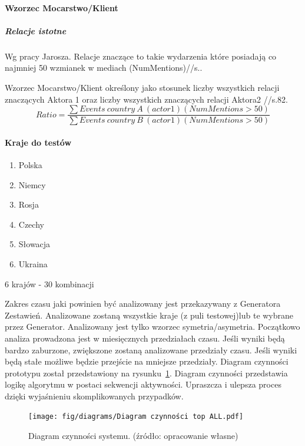 \documentclass[11pt]{report}
\begin{document}
    \paragraph{Wzorzec Mocarstwo/Klient}

    \subparagraph{Relacje istotne}
    Wg pracy Jarosza.
    Relacje znaczące to takie wydarzenia które posiadają co najmniej 50 wzmianek w mediach (NumMentions)//s..

    Wzorzec Mocarstwo/Klient określony jako stosunek liczby wszystkich relacji znaczących Aktora 1 oraz liczby wszystkich znaczących relacji Aktora2 //s.\@ 82.
    \[ Ratio = \frac
    {\sum{Events\ country\ A\ (actor 1) (NumMentions > 50)}}
    {\sum{Events\ country\ B\ (actor 1) (NumMentions > 50)}}
    \]

    \paragraph{Kraje do testów}
    \begin{enumerate}
        \item Polska
        \item Niemcy
        \item Rosja
        \item Czechy
        \item Słowacja
        \item Ukraina
    \end{enumerate}
    6 krajów - 30 kombinacji

    Zakres czasu jaki powinien być analizowany jest przekazywany z Generatora Zestawień.
    Analizowane zostaną wszystkie kraje (z puli testowej)lub te wybrane przez Generator.
    Analizowany jest tylko wzorzec symetria/asymetria.
    Początkowo analiza prowadzona jest w miesięcznych przedziałach czasu.
    Jeśli wyniki będą bardzo zaburzone, zwiększone zostaną analizowane przedziały czasu.
    Jeśli wyniki będą stałe możliwe będzie przejście na mniejsze przedziały.
    Diagram czynności prototypu został przedstawiony na rysunku~\ref{fig:diagram_czynności_top}.
    Diagram czynności przedstawia logikę algorytmu w postaci sekwencji aktywności.
    Upraszcza i ulepsza proces dzięki wyjaśnieniu skomplikowanych przypadków.

    \begin{figure}[!ht]
        \centering
        \texttt{[image: fig/diagrams/Diagram czynności top ALL.pdf]}
        \caption{Diagram czynności systemu. (źródło: opracowanie własne)}
        \label{fig:diagram_czynności_top}
    \end{figure}
\end{document}
